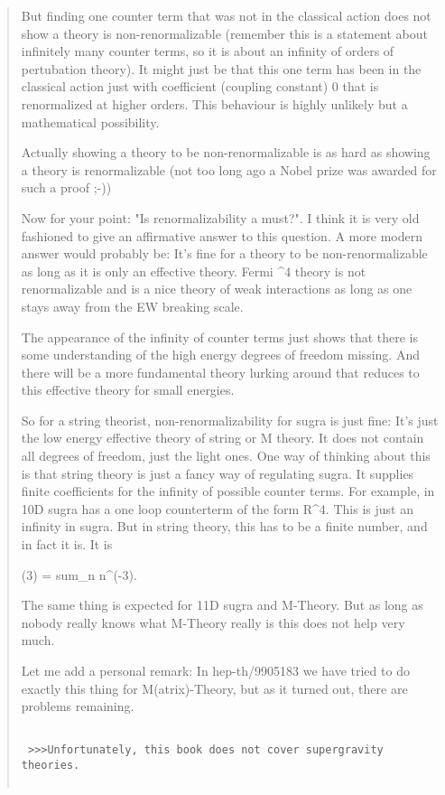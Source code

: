 \begin{quote}
But finding one counter term that was not in the classical action
does not show a theory is non-renormalizable (remember this is a
statement about infinitely many counter terms, so it is about
an infinity of orders of pertubation theory). It might just be
that this one term has been in the classical action just with coefficient
(coupling constant) 0 that is renormalized at higher orders. This
behaviour is highly unlikely but a mathematical possibility.

Actually showing a theory to be non-renormalizable is as hard
as showing a theory is renormalizable (not too long ago a 
Nobel prize was awarded for such a proof ;-))

Now for your point: "Is renormalizability a must?". I think it
is very old fashioned to give an affirmative answer to this 
question. A more modern answer would probably be: It's fine
for a theory to be non-renormalizable as long as it is only
an effective theory. Fermi \psi ^4 theory is not renormalizable
and is a nice theory of weak interactions as long as one
stays away from the EW breaking scale.

The appearance of the infinity of counter terms just shows
that there is some understanding of the high energy degrees
of freedom missing. And there will be a more fundamental
theory lurking around that reduces to this effective
theory for small energies.

So for a string theorist, non-renormalizability for sugra
is just fine: It's just the low energy effective theory
of string or M theory. It does not contain all degrees
of freedom, just the light ones. One way of thinking about
this is that string theory is just a fancy way of regulating
sugra. It supplies finite coefficients for the infinity
of possible counter terms. For example, in 10D sugra has
a one loop counterterm of the form R^4. This is just
an infinity in sugra. But in string theory, this has to be
a finite number, and in fact it is. It is

\zeta (3) = sum_n n^(-3).

The same thing is expected for 11D sugra and M-Theory. But
as long as nobody really knows what M-Theory really is this
does not help very much. 

Let me add a personal remark: In hep-th/9905183 we have
tried to do exactly this thing for M(atrix)-Theory, but
as it turned out, there are problems remaining.


\begin{verbatim}

 >>>Unfortunately, this book does not cover supergravity theories.


\end{verbatim}
\end{quote}
